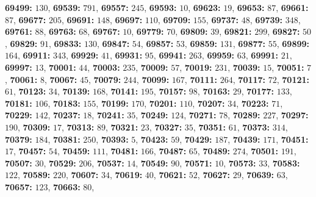 \textsf{\bfseries 69499:} $130$, \textsf{\bfseries 69539:} $791$, \textsf{\bfseries 69557:} $245$, \textsf{\bfseries 69593:} $10$, \textsf{\bfseries 69623:} $19$, \textsf{\bfseries 69653:} $87$, \textsf{\bfseries 69661:} $87$, \textsf{\bfseries 69677:} $205$, \textsf{\bfseries 69691:} $148$, \textsf{\bfseries 69697:} $110$, \textsf{\bfseries 69709:} $155$, \textsf{\bfseries 69737:} $48$, \textsf{\bfseries 69739:} $348$, \textsf{\bfseries 69761:} $88$, \textsf{\bfseries 69763:} $68$, \textsf{\bfseries 69767:} $10$, \textsf{\bfseries 69779:} $70$, \textsf{\bfseries 69809:} $39$, \textsf{\bfseries 69821:} $299$, \textsf{\bfseries 69827:} $50$, \textsf{\bfseries 69829:} $91$, \textsf{\bfseries 69833:} $130$, \textsf{\bfseries 69847:} $54$, \textsf{\bfseries 69857:} $53$, \textsf{\bfseries 69859:} $131$, \textsf{\bfseries 69877:} $55$, \textsf{\bfseries 69899:} $164$, \textsf{\bfseries 69911:} $343$, \textsf{\bfseries 69929:} $41$, \textsf{\bfseries 69931:} $95$, \textsf{\bfseries 69941:} $263$, \textsf{\bfseries 69959:} $63$, \textsf{\bfseries 69991:} $21$, \textsf{\bfseries 69997:} $13$, \textsf{\bfseries 70001:} $44$, \textsf{\bfseries 70003:} $235$, \textsf{\bfseries 70009:} $57$, \textsf{\bfseries 70019:} $231$, \textsf{\bfseries 70039:} $15$, \textsf{\bfseries 70051:} $7$, \textsf{\bfseries 70061:} $8$, \textsf{\bfseries 70067:} $45$, \textsf{\bfseries 70079:} $244$, \textsf{\bfseries 70099:} $167$, \textsf{\bfseries 70111:} $264$, \textsf{\bfseries 70117:} $72$, \textsf{\bfseries 70121:} $61$, \textsf{\bfseries 70123:} $34$, \textsf{\bfseries 70139:} $168$, \textsf{\bfseries 70141:} $195$, \textsf{\bfseries 70157:} $98$, \textsf{\bfseries 70163:} $29$, \textsf{\bfseries 70177:} $133$, \textsf{\bfseries 70181:} $106$, \textsf{\bfseries 70183:} $155$, \textsf{\bfseries 70199:} $170$, \textsf{\bfseries 70201:} $110$, \textsf{\bfseries 70207:} $34$, \textsf{\bfseries 70223:} $71$, \textsf{\bfseries 70229:} $142$, \textsf{\bfseries 70237:} $18$, \textsf{\bfseries 70241:} $35$, \textsf{\bfseries 70249:} $124$, \textsf{\bfseries 70271:} $78$, \textsf{\bfseries 70289:} $227$, \textsf{\bfseries 70297:} $190$, \textsf{\bfseries 70309:} $17$, \textsf{\bfseries 70313:} $89$, \textsf{\bfseries 70321:} $23$, \textsf{\bfseries 70327:} $35$, \textsf{\bfseries 70351:} $61$, \textsf{\bfseries 70373:} $314$, \textsf{\bfseries 70379:} $184$, \textsf{\bfseries 70381:} $250$, \textsf{\bfseries 70393:} $5$, \textsf{\bfseries 70423:} $59$, \textsf{\bfseries 70429:} $187$, \textsf{\bfseries 70439:} $171$, \textsf{\bfseries 70451:} $17$, \textsf{\bfseries 70457:} $54$, \textsf{\bfseries 70459:} $111$, \textsf{\bfseries 70481:} $166$, \textsf{\bfseries 70487:} $65$, \textsf{\bfseries 70489:} $274$, \textsf{\bfseries 70501:} $191$, \textsf{\bfseries 70507:} $30$, \textsf{\bfseries 70529:} $206$, \textsf{\bfseries 70537:} $14$, \textsf{\bfseries 70549:} $90$, \textsf{\bfseries 70571:} $10$, \textsf{\bfseries 70573:} $33$, \textsf{\bfseries 70583:} $122$, \textsf{\bfseries 70589:} $220$, \textsf{\bfseries 70607:} $34$, \textsf{\bfseries 70619:} $40$, \textsf{\bfseries 70621:} $52$, \textsf{\bfseries 70627:} $29$, \textsf{\bfseries 70639:} $63$, \textsf{\bfseries 70657:} $123$, \textsf{\bfseries 70663:} $80$, 
